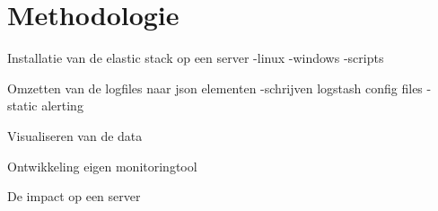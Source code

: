 
\chapter{Methodologie}
\label{ch:methodologie}


Installatie van de elastic stack op een server
 -linux
 -windows
 -scripts
 
Omzetten van de logfiles naar json elementen
 -schrijven logstash config files
 -static alerting
 
Visualiseren van de data

Ontwikkeling eigen monitoringtool 

De impact op een server



